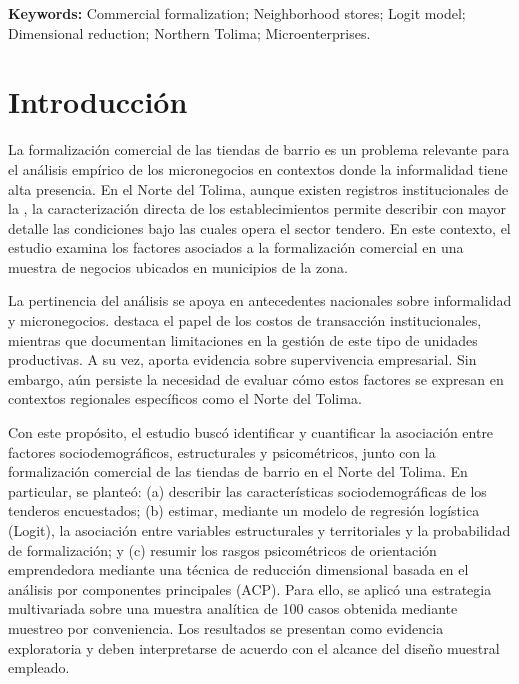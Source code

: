 \documentclass[11pt,a4paper]{article}
\begin{document}
\vspace{0.5em}
\noindent\textbf{Keywords:} Commercial formalization; Neighborhood stores; Logit model; Dimensional reduction; Northern Tolima; Microenterprises.

\section{Introducci\'on}
La formalización comercial de las tiendas de barrio es un problema relevante para el análisis empírico de los micronegocios en contextos donde la informalidad tiene alta presencia. En el Norte del Tolima, aunque existen registros institucionales de la \citet{camara2025}, la caracterización directa de los establecimientos permite describir con mayor detalle las condiciones bajo las cuales opera el sector tendero. En este contexto, el estudio examina los factores asociados a la formalización comercial en una muestra de negocios ubicados en municipios de la zona.

\par
La pertinencia del análisis se apoya en antecedentes nacionales sobre informalidad y micronegocios. \citet{fernandez2020} destaca el papel de los costos de transacción institucionales, mientras que \citet{castiblanco2025} documentan limitaciones en la gestión de este tipo de unidades productivas. A su vez, \citet{ruiloba2024} aporta evidencia sobre supervivencia empresarial. Sin embargo, aún persiste la necesidad de evaluar cómo estos factores se expresan en contextos regionales específicos como el Norte del Tolima.

\par
Con este propósito, el estudio buscó identificar y cuantificar la asociación entre factores sociodemográficos, estructurales y psicométricos, junto con la formalización comercial de las tiendas de barrio en el Norte del Tolima. En particular, se planteó: (a) describir las características sociodemográficas de los tenderos encuestados; (b) estimar, mediante un modelo de regresión logística (Logit), la asociación entre variables estructurales y territoriales y la probabilidad de formalización; y (c) resumir los rasgos psicométricos de orientación emprendedora mediante una técnica de reducción dimensional basada en el análisis por componentes principales (ACP). Para ello, se aplicó una estrategia multivariada sobre una muestra analítica de 100 casos obtenida mediante muestreo por conveniencia. Los resultados se presentan como evidencia exploratoria y deben interpretarse de acuerdo con el alcance del diseño muestral empleado.
\end{document}
